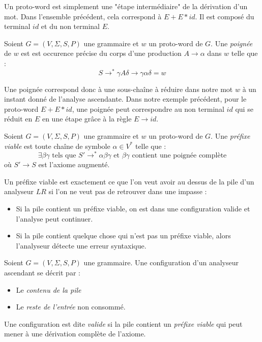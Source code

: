 Un proto-word est simplement une "étape intermédiaire" de la dérivation d'un mot. Dans 
l'ensemble précédent, cela correspond à $ E + E * id$. Il est composé du terminal $id$ et 
du non terminal $E$. 

\begin{definition}
    Soient $G = (V, \Sigma, S, P)$ une grammaire et $w$ un proto-word de $G$. 
    Une \emph{poignée} de $w$ est est occurence précise du corps d'une production $A \to \alpha$ dans 
    $w$ telle que : 
        \[ S \to^* \gamma A \delta \to \gamma \alpha \delta = w \]
\end{definition}

Une poignée correspond donc à une sous-chaîne à réduire dans notre mot $w$ à un instant donné de l'analyse ascendante. 
Dans notre exemple précédent, pour le proto-word $ E + E * id$, une poignée peut correspondre au non terminal 
$id$ qui se réduit en $E$ en une étape grâce à la règle $ E \to id$. 

\begin{definition}
    Soient $G = (V, \Sigma, S, P)$ une grammaire et $w$ un proto-word de $G$. 
    Une \emph{préfixe viable} est toute chaîne de symbole $ \alpha\in V^*$ telle que : 
        \[ \exists \beta \gamma \text{  tels que  }  S' \to^* \alpha \beta \gamma \text{ et } \beta \gamma \text{ contient une poignée complète} \] 
    où $S' \to S$ est l'axiome augmenté.   
\end{definition}

Un préfixe viable est exactement ce que l'on veut avoir au dessus de la pile d'un analyseur $LR$ si l'on ne veut 
pas de retrouver dans une impasse : 
\begin{itemize}
    \item Si la pile contient un préfixe viable, on est dans une configuration valide et l’analyse peut continuer.
    \item Si la pile contient quelque chose qui n’est pas un préfixe viable, alors l’analyseur détecte une erreur syntaxique.
\end{itemize}

\begin{definition}
    Soient $G = (V, \Sigma, S, P)$ une grammaire. Une configuration d'un analyseur ascendant se décrit par : 
    \begin{itemize}
        \item Le \emph{contenu de la pile}
        \item Le \emph{reste de l'entrée} non consommé. 
    \end{itemize}
    Une configuration est dite \emph{valide} si la pile contient un \emph{préfixe viable} qui peut mener à 
    une dérivation complète de l'axiome. 
\end{definition}

